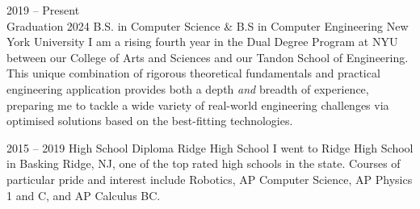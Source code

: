 \documentclass[9pt]{developercv} %
\begin{document}
\begin{entrylist}
	\entry
	{
		2019 -- Present
		\\
		\footnotesize{Graduation 2024}
	}
	{B.S. in Computer Science \& B.S in Computer Engineering}
	{New York University}
	{
		I am a rising fourth year in the Dual Degree Program at NYU between our College of Arts and Sciences and our Tandon School of Engineering.
		This unique combination of rigorous theoretical fundamentals and practical engineering application provides both a depth \textit{and} breadth of experience, preparing me to tackle a wide variety of real-world engineering challenges via optimised solutions based on the best-fitting technologies.
	}

	\entry
	{2015 -- 2019}
	{High School Diploma}
	{Ridge High School}
	{I went to Ridge High School in Basking Ridge, NJ, one of the top rated high schools in the state. Courses of particular pride and interest include Robotics, AP Computer Science, AP Physics 1 and C, and AP Calculus BC.}
\end{entrylist}


\end{document}
